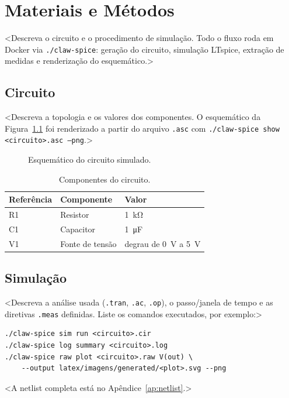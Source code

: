 \chapter{Materiais e Métodos}
\label{cap:metodologia}

<Descreva o circuito e o procedimento de simulação. Todo o fluxo roda em
Docker via \texttt{./claw-spice}: geração do circuito, simulação LTspice,
extração de medidas e renderização do esquemático.>

\section{Circuito}
\label{sec:circuito}

<Descreva a topologia e os valores dos componentes. O esquemático da
Figura~\ref{fig:esquematico} foi renderizado a partir do arquivo
\texttt{.asc} com \texttt{./claw-spice show <circuito>.asc --png}.>

\begin{figure}[htb]
  \centering
  \caption{Esquemático do circuito simulado.}
  \label{fig:esquematico}
\end{figure}

\begin{table}[htb]
  \centering
  \caption{Componentes do circuito.}
  \label{tab:componentes}
  \begin{tabular}{lll}
    \toprule
    Referência & Componente & Valor \\
    \midrule
    R1 & Resistor  & \SI{1}{\kilo\ohm} \\
    C1 & Capacitor & \SI{1}{\micro\farad} \\
    V1 & Fonte de tensão & degrau de \SI{0}{\volt} a \SI{5}{\volt} \\
    \bottomrule
  \end{tabular}
\end{table}

\section{Simulação}
\label{sec:simulacao}

<Descreva a análise usada (\texttt{.tran}, \texttt{.ac}, \texttt{.op}),
o passo/janela de tempo e as diretivas \texttt{.meas} definidas. Liste os
comandos executados, por exemplo:>

\begin{verbatim}
./claw-spice sim run <circuito>.cir
./claw-spice log summary <circuito>.log
./claw-spice raw plot <circuito>.raw V(out) \
    --output latex/imagens/generated/<plot>.svg --png
\end{verbatim}

<A netlist completa está no Apêndice~\ref{ap:netlist}.>
